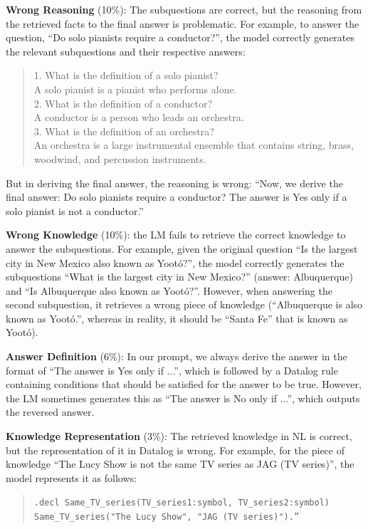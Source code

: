 \documentclass[11pt]{article}
\begin{document}
\textbf{Wrong Reasoning} (10\%): The subquestions are correct, but the reasoning from the retrieved facts to the final answer is problematic. For example, to answer the question, ``Do solo pianists require a conductor?'', the model correctly generates the relevant subquestions and their respective answers: 

\begin{quote}
1. What is the definition of a solo pianist?\\
A solo pianist is a pianist who performs alone.\\
2. What is the definition of a conductor?\\
A conductor is a person who leads an orchestra.\\
3. What is the definition of an orchestra?\\
An orchestra is a large instrumental ensemble that contains string, brass, woodwind, and percussion instruments.
\end{quote}

But in deriving the final answer, the reasoning is wrong: ``Now, we derive the final answer: Do solo pianists require a conductor? The answer is Yes only if a solo pianist is not a conductor.''

\textbf{Wrong Knowledge} (10\%): the LM fails to retrieve the correct knowledge to answer the subquestions. For example, given the original question ``Is the largest city in New Mexico also known as Yootó?'', the model correctly generates the subquestions ``What is the largest city in New Mexico?'' (answer: Albuquerque) and ``Is Albuquerque also known as Yootó?''. However, when answering the second subquestion, it retrieves a wrong piece of knowledge (``Albuquerque is also known as Yootó.'', whereas in reality, it should be ``Santa Fe'' that is known as Yootó). 

\textbf{Answer Definition} (6\%): In our prompt, we always derive the answer in the format of ``The answer is Yes only if ...'', which is followed by a Datalog rule containing conditions that should be satisfied for the answer to be true. However, the LM sometimes generates this as ``The answer is No only if ...'', which outputs the reversed answer.

\textbf{Knowledge Representation} (3\%): The retrieved knowledge in NL is correct, but the representation of it in Datalog is wrong. For example, for the piece of knowledge ``The Lucy Show is not the same TV series as JAG (TV series)'', the model represents it as follows:

\begin{small}
    \begin{quote}
    \texttt{.decl Same\_TV\_series(TV\_series1:symbol, TV\_series2:symbol)}\\
    \texttt{Same\_TV\_series("The Lucy Show", "JAG (TV series)").''}
    \end{quote}
\end{small}
\end{document}
